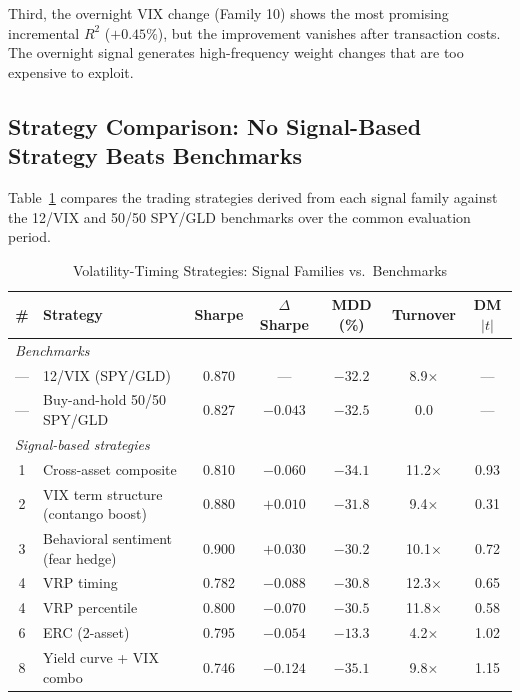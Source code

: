 \documentclass[12pt,a4paper]{article}
\begin{document}
Third, the overnight VIX change (Family 10) shows the most promising incremental $R^2$ ($+0.45\%$), but the improvement vanishes after transaction costs. The overnight signal generates high-frequency weight changes that are too expensive to exploit.

\subsection{Strategy Comparison: No Signal-Based Strategy Beats Benchmarks}

Table~\ref{tab:strategy_results} compares the trading strategies derived from each signal family against the 12/VIX and 50/50 SPY/GLD benchmarks over the common evaluation period.

\begin{table}[H]
\centering
\small
\begin{threeparttable}
\caption{Volatility-Timing Strategies: Signal Families vs.\ Benchmarks}
\label{tab:strategy_results}
\begin{tabular}{@{}clccccc@{}}
\toprule
\# & Strategy & Sharpe & $\Delta$Sharpe & MDD (\%) & Turnover & DM $|t|$ \\
\midrule
\multicolumn{7}{l}{\textit{Benchmarks}} \\
--- & 12/VIX (SPY/GLD) & 0.870 & --- & $-32.2$ & 8.9$\times$ & --- \\
--- & Buy-and-hold 50/50 SPY/GLD & 0.827 & $-0.043$ & $-32.5$ & 0.0 & --- \\
\midrule
\multicolumn{7}{l}{\textit{Signal-based strategies}} \\
1 & Cross-asset composite & 0.810 & $-0.060$ & $-34.1$ & 11.2$\times$ & 0.93 \\
2 & VIX term structure (contango boost) & 0.880 & $+0.010$ & $-31.8$ & 9.4$\times$ & 0.31 \\
3 & Behavioral sentiment (fear hedge) & 0.900 & $+0.030$ & $-30.2$ & 10.1$\times$ & 0.72 \\
4 & VRP timing & 0.782 & $-0.088$ & $-30.8$ & 12.3$\times$ & 0.65 \\
4 & VRP percentile & 0.800 & $-0.070$ & $-30.5$ & 11.8$\times$ & 0.58 \\
6 & ERC (2-asset) & 0.795 & $-0.054$ & $-13.3$ & 4.2$\times$ & 1.02 \\
8 & Yield curve + VIX combo & 0.746 & $-0.124$ & $-35.1$ & 9.8$\times$ & 1.15 \\

\end{tabular}
\end{threeparttable}
\end{table}
\end{document}
